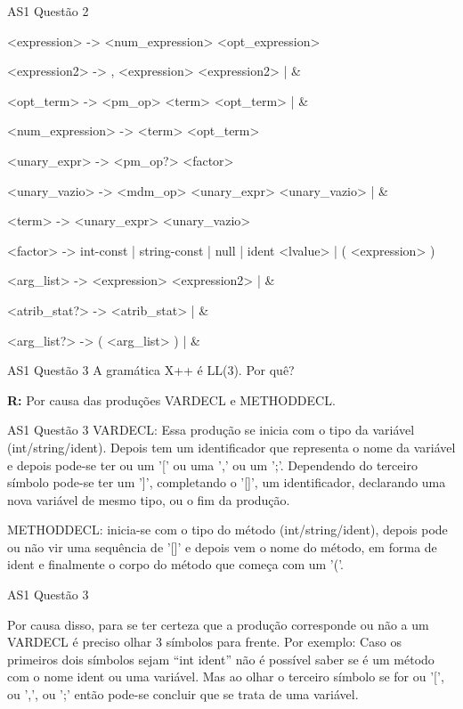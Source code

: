 \documentclass[10pt]{beamer}
\begin{document}
\begin{frame}{AS1 Questão 2}

<expression> -> <num\_expression> <opt\_expression>

<expression2> -> , <expression> <expression2> | \&

<opt\_term> -> <pm\_op> <term> <opt\_term> | \&

<num\_expression> -> <term> <opt\_term>

<unary\_expr> -> <pm\_op?> <factor>

<unary\_vazio> -> <mdm\_op> <unary\_expr> <unary\_vazio> | \&

<term> -> <unary\_expr> <unary\_vazio>

<factor> -> int-const | string-const | null | ident <lvalue> | ( <expression> )

<arg\_list> -> <expression> <expression2> | \&

<atrib\_stat?> -> <atrib\_stat> | \&

<arg\_list?> -> ( <arg\_list> ) | \&

\end{frame}

\begin{frame}{AS1 Questão 3}
    A gramática X++ é LL(3). Por quê?

    \textbf{R:} Por causa das produções VARDECL e METHODDECL.

\end{frame}

\begin{frame}{AS1 Questão 3}
    VARDECL: Essa produção se inicia com o tipo da variável (int/string/ident).
    Depois tem um identificador que representa o nome da variável e depois
    pode-se ter ou um '[' ou uma ',' ou um ';'. Dependendo do terceiro símbolo
    pode-se ter um ']', completando o '[]', um identificador, declarando uma
    nova variável de mesmo tipo, ou o fim da produção.

    METHODDECL: inicia-se com o tipo do método (int/string/ident), depois pode
    ou não vir uma sequência de '[]' e depois vem o nome do método, em forma de
    ident e finalmente o corpo do método que começa com um '('.

\end{frame}

\begin{frame}{AS1 Questão 3}

    Por causa disso, para se ter certeza que a produção corresponde ou não a um
    VARDECL é preciso olhar 3 símbolos para frente. Por exemplo: Caso os
    primeiros dois símbolos sejam ``int ident'' não é possível saber se é um
    método com o nome ident ou uma variável. Mas ao olhar o terceiro símbolo se
    for ou '[', ou ',', ou ';' então pode-se concluir que se trata de uma
    variável.

\end{frame}
\end{document}
